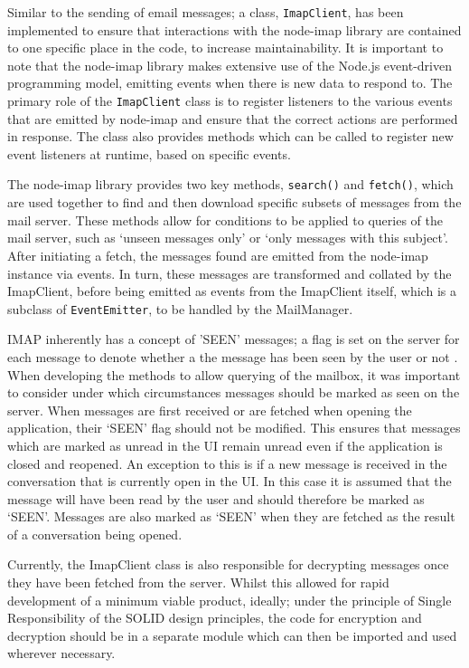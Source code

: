 Similar to the sending of email messages; a class, \verb|ImapClient|, has been implemented to ensure that interactions with the node-imap library are contained to one specific place in the code, to increase maintainability. It is important to note that the node-imap library makes extensive use of the Node.js event-driven programming model, emitting events when there is new data to respond to. The primary role of the \verb|ImapClient| class is to register listeners to the various events that are emitted by node-imap and ensure that the correct actions are performed in response. The class also provides methods which can be called to register new event listeners at runtime, based on specific events.

The node-imap library provides two key methods, \verb|search()| and \verb|fetch()|, which are used together to find and then download specific subsets of messages from the mail server. These methods allow for conditions to be applied to queries of the mail server, such as `unseen messages only' or `only messages with this subject'. After initiating a fetch, the messages found are emitted from the node-imap instance via events. In turn, these messages are transformed and collated by the ImapClient, before being emitted as events from the ImapClient itself, which is a subclass of \verb|EventEmitter|, to be handled by the MailManager.

IMAP inherently has a concept of 'SEEN' messages; a flag is set on the server for each message to denote whether a the message has been seen by the user or not \cite{imap-rfc}. When developing the methods to allow querying of the mailbox, it was important to consider under which circumstances messages should be marked as seen on the server. When messages are first received or are fetched when opening the application, their `SEEN' flag should not be modified. This ensures that messages which are marked as unread in the UI remain unread even if the application is closed and reopened. An exception to this is if a new message is received in the conversation that is currently open in the UI. In this case it is assumed that the message will have been read by the user and should therefore be marked as `SEEN'. Messages are also marked as `SEEN' when they are fetched as the result of a conversation being opened. 

Currently, the ImapClient class is also responsible for decrypting messages once they have been fetched from the server. Whilst this allowed for rapid development of a minimum viable product, ideally; under the principle of Single Responsibility of the SOLID design principles\cite{solid-principles}, the code for encryption and decryption should be in a separate module which can then be imported and used wherever necessary.

